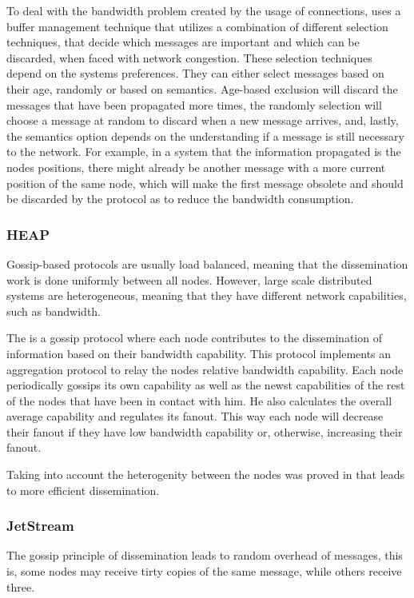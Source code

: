 To deal with the bandwidth problem created by the usage of  connections,
 uses a buffer management technique that utilizes a combination of different
selection techniques, that decide which messages are important and which can be discarded,
when faced with network congestion. These selection techniques depend on the systems
preferences. They can either select messages based on their age, randomly or based on
semantics. Age-based exclusion will discard the messages that have been propagated more times,
the randomly selection will choose a message at random to discard when a new message arrives,
and, lastly, the semantics option depends on the understanding if a message is still necessary
to the network. For example, in a system that the information propagated is the nodes positions,
there might already be another message with a more current position of the same node, which
will make the first message obsolete and should be discarded by the protocol as to reduce the
bandwidth consumption.

\subsubsection{\Gls{HEAP}}
\label{subsubsec:gossip_examples_heap}
Gossip-based protocols are usually load balanced, meaning that the dissemination work is done
uniformly between all nodes. However, large scale distributed systems are heterogeneous, meaning
that they have different network capabilities, such as bandwidth.

The  \cite{Frey2009} is a gossip protocol where each node contributes to the
dissemination of information based on their bandwidth capability. This protocol implements
an aggregation protocol to relay the nodes relative bandwidth capability. Each node periodically
gossips its own capability as well as the newst capabilities of the rest of the nodes that have
been in contact with him. He also calculates the overall average capability and regulates its
fanout. This way each node will decrease their fanout if they have low bandwidth capability
or, otherwise, increasing their fanout.

Taking into account the heterogenity between the nodes was proved in \cite{Frey2009} that leads
to more efficient dissemination.

\subsubsection{JetStream}
\label{subsubsec:gossip_examples_jetstream}
The gossip principle of dissemination leads to random overhead of messages, this is, some
nodes may receive tirty copies of the same message, while others receive three.

